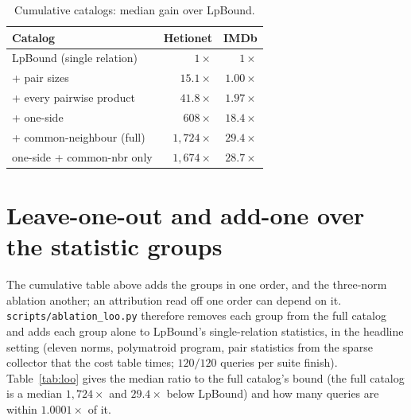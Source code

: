 \documentclass[11pt]{article}
\begin{document}
\begin{table}[h]
\centering
\caption{Cumulative catalogs: median gain over LpBound.}
\label{tab:overlap}
\small
\begin{tabular}{@{}lrr@{}}
\toprule
Catalog & Hetionet & IMDb \\
\midrule
LpBound (single relation) & $1\times$ & $1\times$ \\
+ pair sizes & $15.1\times$ & $1.00\times$ \\
+ every pairwise product & $41.8\times$ & $1.97\times$ \\
+ one-side & $608\times$ & $18.4\times$ \\
+ common-neighbour (full) & $1{,}724\times$ & $29.4\times$ \\
one-side + common-nbr only & $1{,}674\times$ & $28.7\times$ \\
\bottomrule
\end{tabular}
\end{table}

\section{Leave-one-out and add-one over the statistic groups}
The cumulative table above adds the groups in one order, and the three-norm
ablation another; an attribution read off one order can depend on it.
\texttt{scripts/ablation\_loo.py} therefore removes each group from the full
catalog and adds each group alone to LpBound's single-relation statistics, in
the headline setting (eleven norms, polymatroid program, pair statistics from
the sparse collector that the cost table times; $120/120$ queries per suite
finish). Table~\ref{tab:loo} gives the median ratio to the full catalog's bound
(the full catalog is a median $1{,}724\times$ and $29.4\times$ below LpBound)
and how many queries are within $1.0001\times$ of it.
\end{document}
